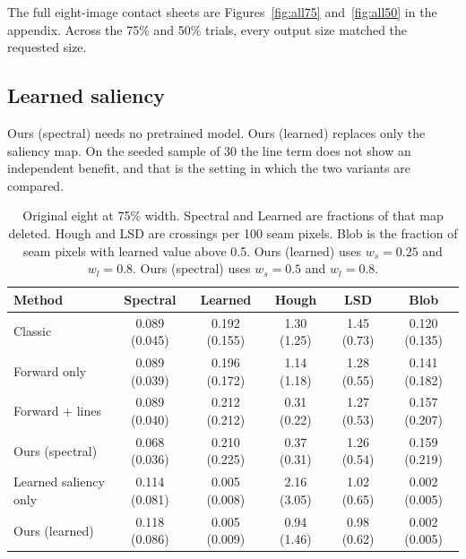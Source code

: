 \documentclass[10pt,twocolumn,letterpaper]{article}
\begin{document}
The full eight-image contact sheets are Figures~\ref{fig:all75} and~\ref{fig:all50} in the appendix.
Across the 75\% and 50\% trials, every output size matched the requested size.

\subsection{Learned saliency}
\label{sec:learned}
Ours (spectral) needs no pretrained model.
Ours (learned) replaces only the saliency map.
On the seeded sample of 30 the line term does not show an independent benefit, and that is the setting in which the two variants are compared.

\begin{table}[t]
\centering
\caption{Original eight at 75\% width. Spectral and Learned are fractions of that map deleted. Hough and LSD are crossings per 100 seam pixels. Blob is the fraction of seam pixels with learned value above 0.5. Ours (learned) uses $w_s = 0.25$ and $w_l = 0.8$. Ours (spectral) uses $w_s = 0.5$ and $w_l = 0.8$.}
\label{tab:learned8}
{\scriptsize
\begin{tabular}{lccccc}
\toprule
Method & Spectral & Learned & Hough & LSD & Blob \\
\midrule
Classic & 0.089 (0.045) & 0.192 (0.155) & 1.30 (1.25) & 1.45 (0.73) & 0.120 (0.135) \\
Forward only & 0.089 (0.039) & 0.196 (0.172) & 1.14 (1.18) & 1.28 (0.55) & 0.141 (0.182) \\
Forward + lines & 0.089 (0.040) & 0.212 (0.212) & 0.31 (0.22) & 1.27 (0.53) & 0.157 (0.207) \\
Ours (spectral) & 0.068 (0.036) & 0.210 (0.225) & 0.37 (0.31) & 1.26 (0.54) & 0.159 (0.219) \\
Learned saliency only & 0.114 (0.081) & 0.005 (0.008) & 2.16 (3.05) & 1.02 (0.65) & 0.002 (0.005) \\
Ours (learned) & 0.118 (0.086) & 0.005 (0.009) & 0.94 (1.46) & 0.98 (0.62) & 0.002 (0.005) \\
\bottomrule
\end{tabular}}


\end{table}
\end{document}
